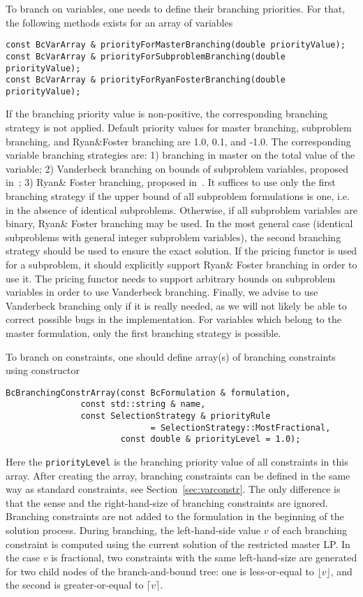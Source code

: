 \documentclass[10pt,a4paper]{article}
\begin{document}
To branch on variables, one needs to define their branching priorities. For that, the following methods exists
for an array of variables
\begin{lstlisting}
const BcVarArray & priorityForMasterBranching(double priorityValue);
const BcVarArray & priorityForSubproblemBranching(double priorityValue);
const BcVarArray & priorityForRyanFosterBranching(double priorityValue);
\end{lstlisting}
If the branching priority value is non-positive, the corresponding branching strategy is not applied. Default priority
values for master branching, subproblem branching, and Ryan\&Foster branching are 1.0, 0.1, and -1.0. The corresponding
variable branching strategies are: 1) branching in master on the total value of the variable; 2) Vanderbeck branching on
bounds of subproblem variables, proposed in~\cite{Vanderbec:11a}; 3) Ryan\& Foster branching, proposed
in~\cite{RyanFoster:81a}. It suffices to use only the first branching strategy if the upper bound of all subproblem
formulations is one, i.e. in the absence of identical subproblems. Otherwise, if all subproblem variables are binary,
Ryan\& Foster branching may be used. In the most general case (identical subproblems with general integer subproblem
variables), the second branching strategy should be used to ensure the exact solution. If the pricing functor is used
for a subproblem, it should explicitly support Ryan\& Foster branching in order to use it. The pricing functor needs to
support arbitrary bounds on subproblem variables in order to use Vanderbeck branching. Finally, we advise to use
Vanderbeck branching only if it is really needed, as we will not likely be able to correct possible bugs in the
implementation. For variables which belong to the master formulation, only the first branching strategy is
possible.

To branch on constraints, one should define array(s) of branching constraints using constructor
\begin{lstlisting}
BcBranchingConstrArray(const BcFormulation & formulation,
		       const std::string & name,
		       const SelectionStrategy & priorityRule 
                             = SelectionStrategy::MostFractional,
                       const double & priorityLevel = 1.0);
\end{lstlisting}
Here the \verb+priorityLevel+ is the branching priority value of all constraints in this array. After creating the
array, branching constraints can be defined in the same way as standard constraints, see
Section~\ref{sec:varconstr}. The only difference is that the sense and the right-hand-size of branching constraints are
ignored. Branching constraints are not added to the formulation in the beginning of the solution process. During
branching, the left-hand-side value $v$ of each branching constraint is computed using the current solution of the
restricted master LP. In the case $v$ is fractional, two constraints with the same left-hand-size are generated for two
child nodes of the branch-and-bound tree: one is less-or-equal to $\lfloor v\rfloor$, and the second is greater-or-equal
to $\lceil v\rceil$.
\end{document}
